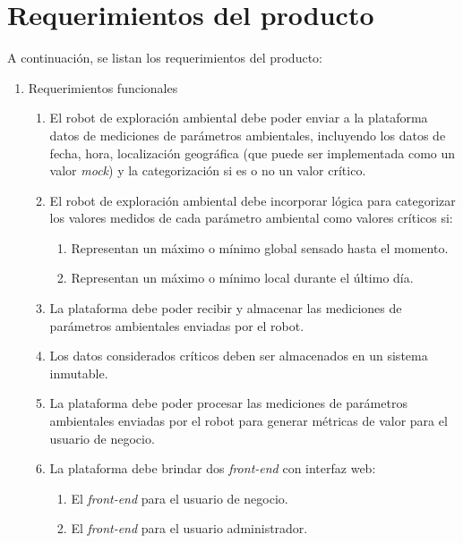 
\section{Requerimientos del producto}


A continuación, se listan los requerimientos del producto:

\begin{enumerate}	
	\item Requerimientos funcionales		
	\begin{enumerate}	
		
		\item El robot de exploración ambiental debe poder enviar a la plataforma datos de mediciones de parámetros ambientales, incluyendo los datos de fecha, hora, localización geográfica (que puede ser implementada como un valor \textit{mock}) y la categorización si es o no un valor crítico.
		\item El robot de exploración ambiental debe incorporar lógica para categorizar los valores medidos de cada parámetro ambiental como valores críticos si:
		\begin{enumerate}				
			\item Representan un máximo o mínimo global sensado hasta el momento.				
			\item Representan un máximo o mínimo local durante el último día.				
		\end{enumerate}			
		\item La plataforma debe poder recibir y almacenar las mediciones de parámetros ambientales enviadas por el robot.
		\item Los datos considerados críticos deben ser almacenados en un sistema inmutable.
		\item La plataforma debe poder procesar las mediciones de parámetros ambientales enviadas por el robot para generar métricas de valor para el usuario de negocio.		
		\item La plataforma debe brindar dos \textit{front-end} con interfaz web:
			\begin{enumerate}				
				\item El \textit{front-end} para el usuario de negocio.				
				\item El \textit{front-end} para el usuario administrador.				
			\end{enumerate}			
		

\end{enumerate}
\end{enumerate}
